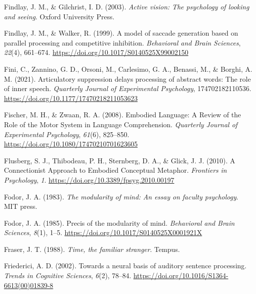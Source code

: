 \documentclass[
  a4paper,12pt,twoside,onecolumn,openright,final,oldfontcommands]{memoir}
\newlength{\cslhangindent}
\newlength{\cslentryspacingunit} %
\newenvironment{CSLReferences}[2] %
 {%
  \setlength{\parindent}{0pt}
  \ifodd #1
  \let\oldpar\par
  \def\par{\hangindent=\cslhangindent\oldpar}
  \fi
  \setlength{\parskip}{#2\cslentryspacingunit}
 }%
 {}
\begin{document}
\begin{CSLReferences}{1}{0}
\leavevmode{}%
Findlay, J. M., \& Gilchrist, I. D. (2003). \emph{Active vision: The psychology of looking and seeing}. Oxford University Press.

\leavevmode{}%
Findlay, J. M., \& Walker, R. (1999). A model of saccade generation based on parallel processing and competitive inhibition. \emph{Behavioral and Brain Sciences}, \emph{22}(4), 661--674. \url{https://doi.org/10.1017/S0140525X99002150}

\leavevmode{}%
Fini, C., Zannino, G. D., Orsoni, M., Carlesimo, G. A., Benassi, M., \& Borghi, A. M. (2021). Articulatory suppression delays processing of abstract words: {The} role of inner speech. \emph{Quarterly Journal of Experimental Psychology}, 174702182110536. \url{https://doi.org/10.1177/17470218211053623}

\leavevmode{}%
Fischer, M. H., \& Zwaan, R. A. (2008). Embodied {Language}: {A} {Review} of the {Role} of the {Motor} {System} in {Language} {Comprehension}. \emph{Quarterly Journal of Experimental Psychology}, \emph{61}(6), 825--850. \url{https://doi.org/10.1080/17470210701623605}

\leavevmode{}%
Flusberg, S. J., Thibodeau, P. H., Sternberg, D. A., \& Glick, J. J. (2010). A {Connectionist} {Approach} to {Embodied} {Conceptual} {Metaphor}. \emph{Frontiers in Psychology}, \emph{1}. \url{https://doi.org/10.3389/fpsyg.2010.00197}

\leavevmode{}%
Fodor, J. A. (1983). \emph{The modularity of mind: An essay on faculty psychology}. MIT press.

\leavevmode{}%
Fodor, J. A. (1985). Precis of the modularity of mind. \emph{Behavioral and Brain Sciences}, \emph{8}(1), 1--5. \url{https://doi.org/10.1017/S0140525X0001921X}

\leavevmode{}%
Fraser, J. T. (1988). \emph{Time, the familiar stranger}. Tempus.

\leavevmode{}%
Friederici, A. D. (2002). Towards a neural basis of auditory sentence processing. \emph{Trends in Cognitive Sciences}, \emph{6}(2), 78--84. \url{https://doi.org/10.1016/S1364-6613(00)01839-8}


\end{CSLReferences}
\end{document}

